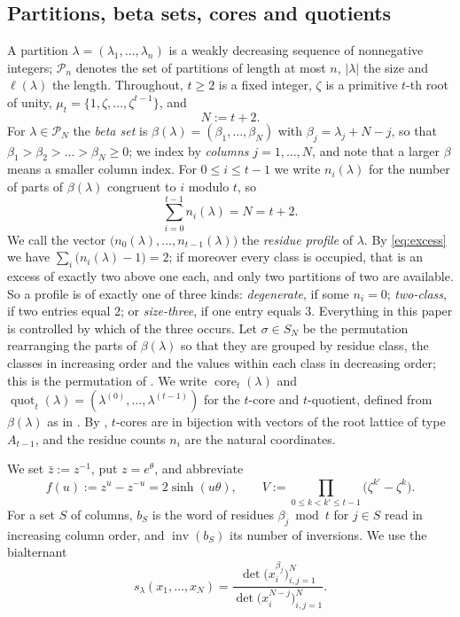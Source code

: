 \documentclass[11pt,reqno]{amsart}
\theoremstyle{plain}
\theoremstyle{definition}
\newcommand{\PP}{\mathcal{P}}
\newcommand{\zt}{\mu_t}
\newcommand{\inv}{\operatorname{inv}}
\newcommand{\core}{\operatorname{core}}
\newcommand{\quot}{\operatorname{quot}}
\newcommand{\zb}{\bar z}
\begin{document}
\subsection{Partitions, beta sets, cores and quotients}
A partition $\lambda=(\lambda_1,\dots,\lambda_n)$ is a weakly decreasing sequence of nonnegative
integers; $\PP_n$ denotes the set of partitions of length at most $n$, $|\lambda|$ the size and
$\ell(\lambda)$ the length. Throughout, $t\ge2$ is a fixed integer, $\zeta$ is a primitive $t$-th root
of unity, $\zt=\{1,\zeta,\dots,\zeta^{t-1}\}$, and
\[
N:=t+2 .
\]
For $\lambda\in\PP_N$ the \emph{beta set} is $\beta(\lambda)=(\beta_1,\dots,\beta_N)$ with
$\beta_j=\lambda_j+N-j$, so that $\beta_1>\beta_2>\dots>\beta_N\ge0$; we index by \emph{columns}
$j=1,\dots,N$, and note that a larger $\beta$ means a smaller column index. For $0\le i\le t-1$ we
write $n_i(\lambda)$ for the number of parts of $\beta(\lambda)$ congruent to $i$ modulo $t$, so
\begin{equation}\label{eq:excess}
\sum_{i=0}^{t-1}n_i(\lambda)=N=t+2 .
\end{equation}
We call the vector $\bigl(n_0(\lambda),\dots,n_{t-1}(\lambda)\bigr)$ the \emph{residue profile} of
$\lambda$. By \eqref{eq:excess} we have $\sum_i\bigl(n_i(\lambda)-1\bigr)=2$; if moreover every class
is occupied, that is an excess of exactly two above one each, and only two partitions of two are
available. So a profile is of exactly one of three kinds: \emph{degenerate}, if some $n_i=0$;
\emph{two-class}, if two entries equal $2$; or \emph{size-three}, if one entry equals $3$.
Everything in this paper is controlled by which of the three occurs.
Let $\sigma\in S_N$ be the permutation rearranging the parts of $\beta(\lambda)$ so that they are
grouped by residue class, the classes in increasing order and the values within each class in
decreasing order; this is the permutation of \cite[(2.1)]{AK25}. We write $\core_t(\lambda)$ and
$\quot_t(\lambda)=(\lambda^{(0)},\dots,\lambda^{(t-1)})$ for the $t$-core and $t$-quotient, defined
from $\beta(\lambda)$ as in \cite[\S2.1]{AK25}. By \cite{GKS90}, $t$-cores are in bijection with
vectors of the root lattice of type $A_{t-1}$, and the residue counts $n_i$ are the natural
coordinates.

We set $\zb:=z^{-1}$, put $z=e^{\theta}$, and abbreviate
\[
f(u):=z^{u}-z^{-u}=2\sinh(u\theta),\qquad
V:=\prod_{0\le k<k'\le t-1}\bigl(\zeta^{k'}-\zeta^{k}\bigr).
\]
For a set $S$ of columns, $b_S$ is the word of residues $\beta_j\bmod t$ for $j\in S$ read in
increasing column order, and $\inv(b_S)$ its number of inversions. We use the bialternant
\[
s_\lambda(x_1,\dots,x_N)=\frac{\det\bigl(x_i^{\beta_j}\bigr)_{i,j=1}^N}
{\det\bigl(x_i^{N-j}\bigr)_{i,j=1}^N}.
\]
\end{document}
